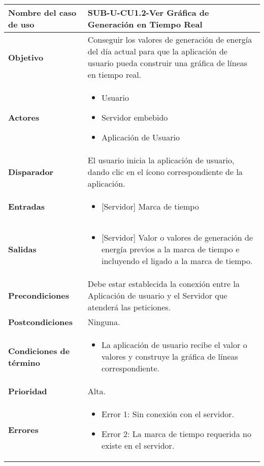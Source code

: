 \begin{longtable}{|J{5cm}|J{10.3cm}|}
	\hline
	\textbf{Nombre del caso de uso} &
		SUB-U-CU1.2-Ver Gráfica de Generación en Tiempo Real \\ \hline
	\textbf{Objetivo} &
		Conseguir los valores de generación de energía del día actual para que la aplicación de usuario pueda construir una gráfica de líneas en tiempo real. \\ \hline
	\textbf{Actores} &
		\begin{itemize}
		    \item Usuario
			\item Servidor embebido
			\item Aplicación de Usuario
		\end{itemize} \\ \hline
	\textbf{Disparador} & 
	    El usuario inicia la aplicación de usuario, dando clic en el ícono correspondiente de la aplicación.\\ \hline 
	\textbf{Entradas} & 
		\begin{itemize}
				\item{[Servidor]} Marca de tiempo
		\end{itemize}\\ \hline 
	\textbf{Salidas} & 
		\begin{itemize}
			\item{[Servidor]} Valor o valores de generación de energía previos a la marca de tiempo e incluyendo el ligado a la marca de tiempo.
		\end{itemize} \\ \hline
	\textbf{Precondiciones} &
		Debe estar establecida la conexión entre la Aplicación de usuario y el Servidor que atenderá las peticiones.
		\\ \hline
	\textbf{Postcondiciones} &
		Ninguna.\\ \hline
	\textbf{Condiciones de término} & 
		\begin{itemize}
			\item La aplicación de usuario recibe el valor o valores y construye la gráfica de líneas correspondiente.
		\end{itemize} \\ \hline 
	\textbf{Prioridad} & 
		Alta. \\ \hline
	\textbf{Errores} & 
		\begin{itemize}
		    \item \label{CUU1.2:Error1} Error 1: Sin conexión con el servidor.
			\item \label{CUU1.2:Error2} Error 2: La marca de tiempo requerida no existe en el servidor.

\end{itemize}
\end{longtable}
